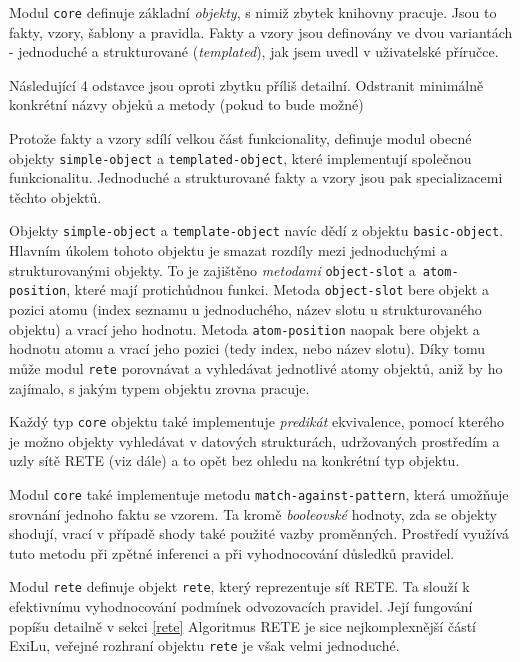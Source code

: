 Modul \verb|core| definuje základní \emph{objekty}, s nimiž zbytek knihovny pracuje.
Jsou to fakty, vzory, šablony a pravidla. Fakty a vzory jsou definovány ve dvou
variantách - jednoduché a strukturované (\emph{templated}), jak jsem uvedl v
uživatelské příručce.

\begin{framed}
Následující 4 odstavce jsou oproti zbytku příliš detailní. Odstranit minimálně
konkrétní názvy objeků a metody (pokud to bude možné)
\end{framed}

Protože fakty a vzory sdílí velkou část funkcionality, definuje modul obecné
objekty \verb|simple-object| a \verb|templated-object|, které implementují
společnou funkcionalitu. Jednoduché a strukturované fakty a vzory jsou pak
specializacemi těchto objektů.

Objekty \verb|simple-object| a \verb|template-object| navíc dědí z objektu
\verb|basic-object|. Hlavním úkolem tohoto objektu je smazat rozdíly mezi
jednoduchými a strukturovanými objekty. To je zajištěno \emph{metodami}
\verb|object-slot| a~\verb|atom-position|, které mají protichůdnou funkci.
Metoda \verb|object-slot| bere objekt a pozici atomu (index seznamu u
jednoduchého, název slotu u strukturovaného objektu) a vrací jeho hodnotu.
Metoda \verb|atom-position| naopak bere objekt a hodnotu atomu a vrací jeho
pozici (tedy index, nebo název slotu). Díky tomu může modul \verb|rete|
porovnávat a vyhledávat jednotlivé atomy objektů, aniž by ho zajímalo, s jakým
typem objektu zrovna pracuje.

Každý typ \verb|core| objektu také implementuje \emph{predikát} ekvivalence,
pomocí kterého je možno objekty vyhledávat v datových strukturách, udržovaných
prostředím a uzly sítě RETE (viz dále) a to opět bez ohledu na konkrétní typ
objektu.

Modul \verb|core| také implementuje metodu \verb|match-against-pattern|, která
umožňuje srovnání jednoho faktu se vzorem. Ta kromě \emph{booleovské} hodnoty,
zda se objekty shodují, vrací v případě shody také použité vazby proměnných.
Prostředí využívá tuto metodu při zpětné inferenci a při vyhodnocování důsledků
pravidel.

Modul \verb|rete| definuje objekt \verb|rete|, který reprezentuje síť RETE. Ta
slouží k efektivnímu vyhodnocování podmínek odvozovacích pravidel. Její
fungování popíšu detailně v sekci \ref{rete} Algoritmus RETE je sice
nejkomplexnější částí ExiLu, veřejné rozhraní objektu \verb|rete| je však velmi
jednoduché.

